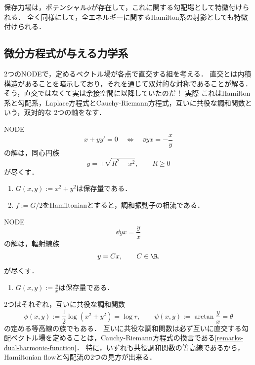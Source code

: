 \documentclass[uplatex,dvipdfmx]{jsreport}
\begin{document}
\begin{example}[力学の古典的な例]
    保存力場は，ポテンシャル$\phi$が存在して，これに関する勾配場として特徴付けられる\cite{深谷賢治-電磁気}．
    全く同様にして，全エネルギーに関するHamilton系の射影としても特徴付けられる．
\end{example}

\subsection{微分方程式が与える力学系}

\begin{tcolorbox}[colframe=ForestGreen, colback=ForestGreen!10!white,breakable,colbacktitle=ForestGreen!40!white,coltitle=black,fonttitle=\bfseries\sffamily,
title=]
    2つのNODEで，定めるベクトル場が各点で直交する組を考える．
    直交とは内積構造があることを暗示しており，それを通じて双対的な対称であることが解る．
    そう，直交ではなくて実は余接空間に以降していたのだ！
    実際
    これはHamilton系と勾配系，Laplace方程式とCauchy-Riemann方程式，互いに共役な調和関数という，双対的な
    2つの軸をなす．
\end{tcolorbox}

\begin{example}[同心円族]\label{exp-同心円族}
    NODE
    \[x+yy'=0\quad\Leftrightarrow\quad\dd{y}{x}=-\frac{x}{y}\]
    の解は，同心円族
    \[y=\pm\sqrt{R^2-x^2},\qquad R\ge0\]
    が尽くす．
    \begin{enumerate}
        \item $G(x,y):=x^2+y^2$は保存量である．
        \item $f:=G/2$をHamiltonianとすると，調和振動子の相流である．
    \end{enumerate}
\end{example}

\begin{example}[輻射線族]\label{exp-輻射線族}
    NODE
    \[\dd{y}{x}=\frac{y}{x}\]
    の解は，輻射線族
    \[y=Cx,\qquad C\in\R.\]
    が尽くす．
    \begin{enumerate}
        \item $G(x,y):=\frac{y}{x}$は保存量である．
    \end{enumerate}
\end{example}

\begin{remarks}
    2つはそれぞれ，互いに共役な調和関数
    \[\phi(x,y):=\frac{1}{2}\log(x^2+y^2)=\log r,\qquad\psi(x,y):=\arctan\frac{y}{x}=\theta\]
    の定める等高線の族でもある．
    互いに共役な調和関数は必ず互いに直交する勾配ベクトル場を定めることは，Cauchy-Riemann方程式の換言である\ref{remarks-dual-harmonic-function}．
    特に，いずれも共役調和関数の等高線であるから，Hamiltonian flowと勾配流の2つの見方が出来る．
\end{remarks}
\end{document}
